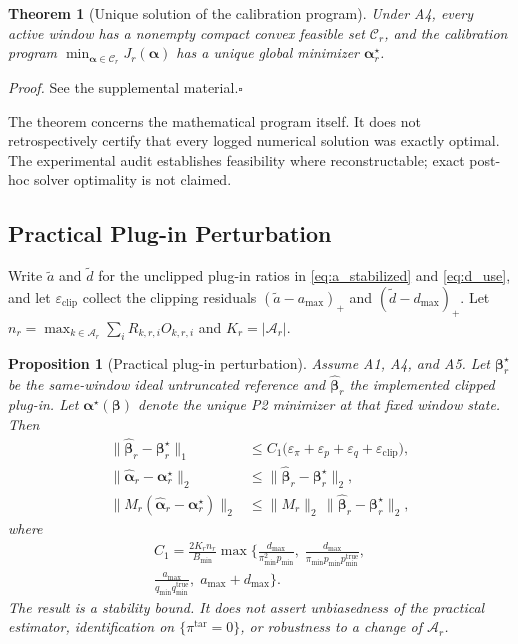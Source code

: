 \documentclass[letterpaper,journal]{IEEEtran}
\newtheorem{theorem}{Theorem}
\newtheorem{proposition}{Proposition}
\begin{document}
\begin{theorem}[Unique solution of the calibration program]
\label{thm:calibration}
Under A4, every active window has a nonempty compact convex feasible set
$\mathcal{C}_r$, and the calibration program
$\min_{\boldsymbol\alpha\in\mathcal{C}_r}J_r(\boldsymbol\alpha)$
has a unique global minimizer $\boldsymbol\alpha_r^\star$.
\end{theorem}

\noindent\emph{Proof.}
See the supplemental material.\hfill$\square$

The theorem concerns the mathematical program itself.  It does not
retrospectively certify that every logged numerical solution was exactly
optimal.  The experimental audit establishes feasibility where reconstructable;
exact post-hoc solver optimality is not claimed.

\subsection{Practical Plug-in Perturbation}
\label{subsec:prop_plugin}

Write $\widetilde a$ and $\widetilde d$ for the unclipped plug-in ratios
in \eqref{eq:a_stabilized} and \eqref{eq:d_use}, and let
$\varepsilon_{\mathrm{clip}}$ collect the clipping residuals
$(\widetilde a-a_{\max})_+$ and $(\widetilde d-d_{\max})_+$.
Let $n_r=\max_{k\in\mathcal{A}_r}\sum_i R_{k,r,i}O_{k,r,i}$ and
$K_r=|\mathcal{A}_r|$.

\begin{proposition}[Practical plug-in perturbation]
\label{prop:practical_plugin}
Assume A1, A4, and A5.  Let $\boldsymbol\beta_r^\star$ be the
same-window ideal untruncated reference and
$\widehat{\boldsymbol\beta}_r$ the implemented clipped plug-in.  Let
$\boldsymbol\alpha^\star(\boldsymbol\beta)$ denote the unique P2 minimizer
at that fixed window state.  Then
\begin{align}
\bigl\|\widehat{\boldsymbol\beta}_r-\boldsymbol\beta_r^\star\bigr\|_1
&\le
C_1\bigl(\varepsilon_\pi+\varepsilon_p+\varepsilon_q+\varepsilon_{\mathrm{clip}}\bigr),
\label{eq:g4_beta}\\
\bigl\|\widehat{\boldsymbol\alpha}_r-\boldsymbol\alpha_r^\star\bigr\|_2
&\le
\bigl\|\widehat{\boldsymbol\beta}_r-\boldsymbol\beta_r^\star\bigr\|_2,
\label{eq:g4_alpha}\\
\bigl\|M_r(\widehat{\boldsymbol\alpha}_r-\boldsymbol\alpha_r^\star)\bigr\|_2
&\le
\|M_r\|_2\,
\bigl\|\widehat{\boldsymbol\beta}_r-\boldsymbol\beta_r^\star\bigr\|_2,
\label{eq:g4_comp}
\end{align}
where
\begin{multline}
C_1
=
\frac{2K_r n_r}{B_{\min}}
\max\Biggl\{
\frac{d_{\max}}{\pi_{\min}^2 p_{\min}},\;
\frac{d_{\max}}{\pi_{\min}p_{\min}p_{\min}^{\mathrm{true}}},\\
\frac{a_{\max}}{q_{\min}q_{\min}^{\mathrm{true}}},\;
a_{\max}+d_{\max}
\Biggr\}.
\label{eq:g4_c1}
\end{multline}
The result is a stability bound.  It does not assert unbiasedness of the
practical estimator, identification on $\{\pi^{\mathrm{tar}}=0\}$, or
robustness to a change of $\mathcal{A}_r$.
\end{proposition}
\end{document}
